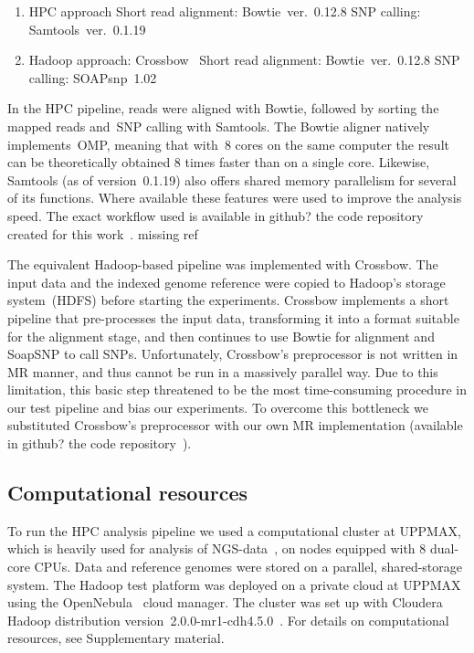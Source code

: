 \documentclass[11pt, oneside]{article}   	%
\newcommand{\COMMENT}[1]{{\color{red} #1 }}
\begin{document}


\begin{enumerate}
\item HPC approach
\subitem Short read alignment: Bowtie~ver.~0.12.8
\subitem SNP calling: Samtools~ver.~0.1.19
\item Hadoop approach: Crossbow~\cite{crossbow}
\subitem Short read alignment: Bowtie~ver.~0.12.8
\subitem SNP calling: SOAPsnp~1.02~\cite{soapsnp}
\end{enumerate}


In the HPC pipeline, reads were aligned with Bowtie, followed by sorting the mapped reads and~SNP calling with Samtools. The Bowtie aligner natively implements~OMP, meaning that with~8 cores on the same computer the result can be theoretically obtained 8 times faster than on a single core. Likewise, Samtools (as of version~0.1.19) also offers shared memory parallelism for several of its functions. Where available these features were used to improve the analysis speed. The exact workflow used is available in \COMMENT{github?} the code repository created for this work~\cite{code_repo}. \COMMENT{missing ref}

The equivalent Hadoop-based pipeline was implemented with Crossbow. The input data and the indexed genome reference were copied to Hadoop's storage system~(HDFS) before starting the experiments. Crossbow implements a short pipeline that pre-processes the input data, transforming it into a format suitable for the alignment stage, and then continues to use Bowtie for alignment and SoapSNP to call SNPs.  Unfortunately, Crossbow's preprocessor is not written in MR manner, and thus cannot be run in a massively parallel way. Due to this limitation, this basic step threatened to be the most time-consuming procedure in our test pipeline and bias our experiments. To overcome this bottleneck we substituted Crossbow's preprocessor with our own MR implementation (available in \COMMENT{github?} the code repository~\cite{code_repo}).



\subsection{Computational resources}
To run the HPC analysis pipeline we used a computational cluster at UPPMAX, which is heavily used for analysis of NGS-data~\cite{lampa}, on nodes equipped with 8 dual-core CPUs. Data and reference genomes were stored on a parallel, shared-storage system. The Hadoop test platform was deployed on a private cloud at UPPMAX using the OpenNebula~\cite{opennebula} cloud manager. The cluster was set up with Cloudera Hadoop distribution version~2.0.0-mr1-cdh4.5.0~\cite{cloudera}. For details on computational resources, see Supplementary material.
\end{document}
